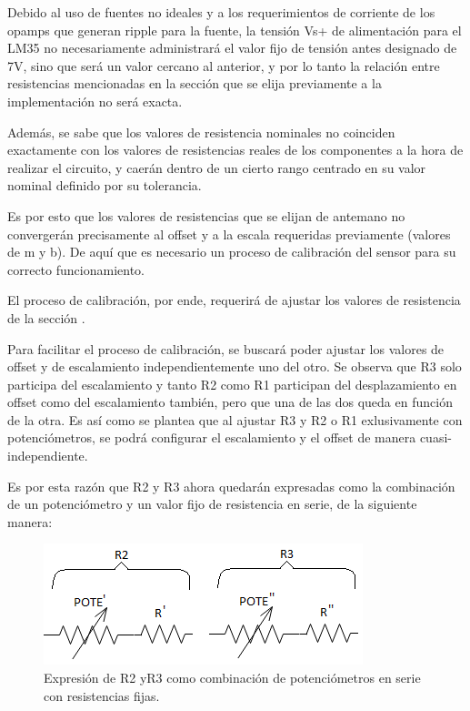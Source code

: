 \documentclass[../../main.tex]{subfiles}
\begin{document}
Debido al uso de fuentes no ideales y a los requerimientos de corriente de los opamps que generan ripple para la fuente, la tensión Vs+ de alimentación para el LM35 no necesariamente administrará el valor fijo de tensión antes designado de 7V, sino que será un valor cercano al anterior, y por lo tanto la relación entre resistencias mencionadas en la sección  que se elija previamente a la implementación no será exacta. \par
Además, se sabe que los valores de resistencia nominales no coinciden exactamente con los valores de resistencias reales de los componentes a la hora de realizar el circuito, y caerán dentro de un cierto rango centrado en su valor nominal definido por su tolerancia. \par
Es por esto que los valores de resistencias que se elijan de antemano no convergerán precisamente al offset y a la escala requeridas previamente (valores de m y b). De aquí que es necesario un proceso de calibración del sensor para su correcto funcionamiento.\par
El proceso de calibración, por ende, requerirá de ajustar los valores de resistencia de la sección . \par
Para facilitar el proceso de calibración, se buscará poder ajustar los valores de offset y de escalamiento independientemente uno del otro. Se observa que R3 solo participa del escalamiento y tanto R2 como R1 participan del desplazamiento en offset como del escalamiento también, pero que una de las dos queda en función de la otra. Es así como se plantea que al ajustar R3 y R2 o R1 exlusivamente con potenciómetros, se podrá configurar el escalamiento y el offset de manera cuasi-independiente. \par
Es por esta razón que R2 y R3 ahora quedarán expresadas como la combinación de un potenciómetro y un valor fijo de resistencia en serie, de la siguiente manera:

\begin{figure}[H]	%
	\centering
	\includegraphics[scale=2]{imagenes/nueva_disposicion_rs.png}
	\caption{Expresión de R2 yR3 como combinación de potenciómetros en serie con resistencias fijas.}
	\label{fig:ej6_nueva_disposicion_rs}
\end{figure}
\end{document}
